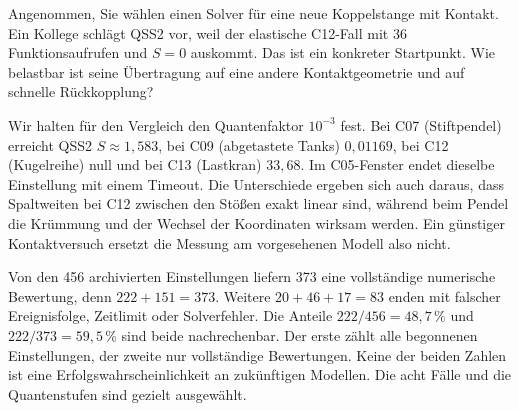 Angenommen, Sie wählen einen Solver für eine neue Koppelstange mit Kontakt. Ein Kollege schlägt QSS2 vor, weil der elastische C12-Fall mit 36 Funktionsaufrufen und \(S=0\) auskommt. Das ist ein konkreter Startpunkt. Wie belastbar ist seine Übertragung auf eine andere Kontaktgeometrie und auf schnelle Rückkopplung?

Wir halten für den Vergleich den Quantenfaktor \(10^{-3}\) fest. Bei C07 (Stiftpendel) erreicht QSS2 \(S\approx1{,}583\), bei C09 (abgetastete Tanks) \(0{,}01169\), bei C12 (Kugelreihe) null und bei C13 (Lastkran) \(33{,}68\). Im C05-Fenster endet dieselbe Einstellung mit einem Timeout. Die Unterschiede ergeben sich auch daraus, dass Spaltweiten bei C12 zwischen den Stößen exakt linear sind, während beim Pendel die Krümmung und der Wechsel der Koordinaten wirksam werden. Ein günstiger Kontaktversuch ersetzt die Messung am vorgesehenen Modell also nicht.

Von den 456 archivierten Einstellungen liefern 373 eine vollständige numerische Bewertung, denn \(222+151=373\). Weitere \(20+46+17=83\) enden mit falscher Ereignisfolge, Zeitlimit oder Solverfehler. Die Anteile \(222/456=48{,}7\,\%\) und \(222/373=59{,}5\,\%\) sind beide nachrechenbar. Der erste zählt alle begonnenen Einstellungen, der zweite nur vollständige Bewertungen. Keine der beiden Zahlen ist eine Erfolgswahrscheinlichkeit an zukünftigen Modellen. Die acht Fälle und die Quantenstufen sind gezielt ausgewählt.



